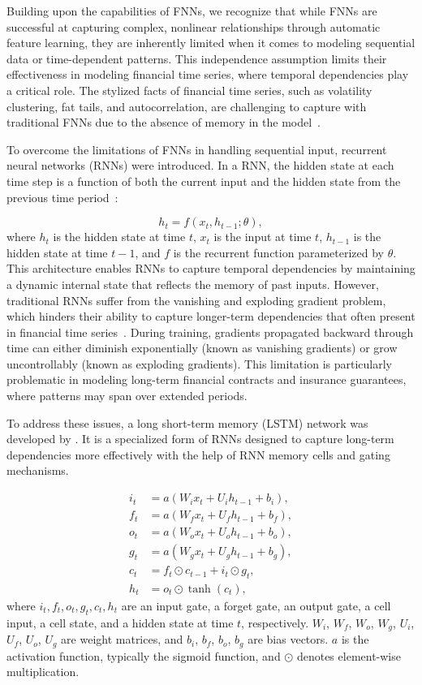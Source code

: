 Building upon the capabilities of FNNs, we recognize that while FNNs are successful at capturing complex, nonlinear relationships through automatic feature learning, they are inherently limited when it comes to modeling sequential data or time-dependent patterns. 
This independence assumption limits their effectiveness in modeling financial time series, where temporal dependencies play a critical role. 
The stylized facts of financial time series, such as volatility clustering, fat tails, and autocorrelation, are challenging to capture with traditional FNNs due to the absence of memory in the model~\citep{cont2001empirical}.

To overcome the limitations of FNNs in handling sequential input, recurrent neural networks (RNNs) were introduced.
In a RNN, the hidden state at each time step is a function of both the current input and the hidden state from the previous time period~\citep{elman1990finding}:

\begin{equation}
    h_t = f(x_t, h_{t-1}; \theta),
\end{equation}
where $h_t$ is the hidden state at time $t$, $x_t$ is the input at time $t$, $h_{t-1}$ is the hidden state at time $t-1$, and $f$ is the recurrent function parameterized by $\theta$.
This architecture enables RNNs to capture temporal dependencies by maintaining a dynamic internal state that reflects the memory of past inputs.
However, traditional RNNs suffer from the vanishing and exploding gradient problem, which hinders their ability to capture longer-term dependencies that often present in financial time series~\citep{bengio1994learning}.
During training, gradients propagated backward through time can either diminish exponentially (known as vanishing gradients) or grow uncontrollably (known as exploding gradients).
This limitation is particularly problematic in modeling long-term financial contracts and insurance guarantees, where patterns may span over extended periods.

To address these issues, a long short-term memory (LSTM) network was developed by \citet{hochreiter1997long}.
It is a specialized form of RNNs designed to capture long-term dependencies more effectively with the help of RNN memory cells and gating mechanisms.

\begin{align*}
    i_t &= a(W_i x_t + U_i h_{t-1} + b_i), \\
    f_t &= a(W_f x_t + U_f h_{t-1} + b_f), \\
    o_t &= a(W_o x_t + U_o h_{t-1} + b_o), \\
    g_t &= a(W_g x_t + U_g h_{t-1} + b_g), \\
    c_t &= f_t \odot c_{t-1} + i_t \odot g_t, \\
    h_t &= o_t \odot \tanh(c_t),
\end{align*}
where $i_t, f_t, o_t, g_t, c_t, h_t$ are an input gate, a forget gate, an output gate, a cell input, a cell state, and a hidden state at time $t$, respectively.
$W_i$, $W_f$, $W_o$, $W_g$, $U_i$, $U_f$, $U_o$, $U_g$ are weight matrices, and $b_i$, $b_f$, $b_o$, $b_g$ are bias vectors.
$a$ is the activation function, typically the sigmoid function, and $\odot$ denotes element-wise multiplication.


